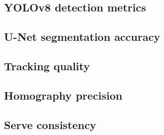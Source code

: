 \subsection{YOLOv8 detection metrics}

\subsection{U-Net segmentation accuracy}

\subsection{Tracking quality}

\subsection{Homography precision}

\subsection{Serve consistency}
